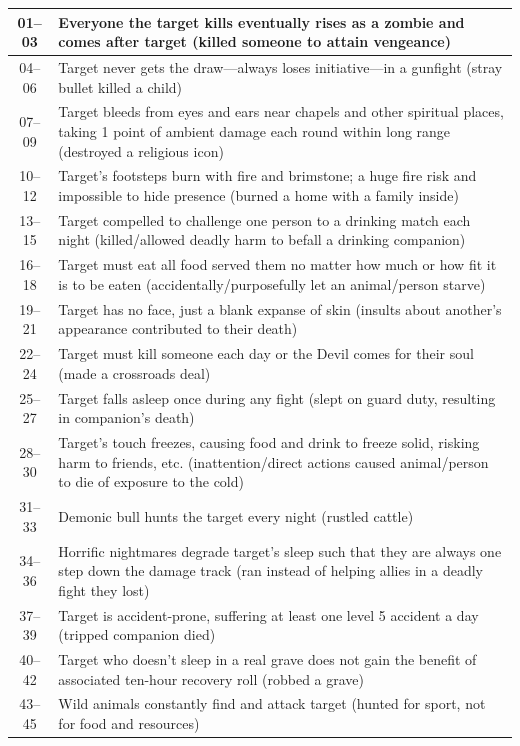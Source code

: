 \begin{longtable}{| c | p{15cm} |}
01–03 & Everyone the target kills eventually rises as a zombie and comes after target (killed someone to attain vengeance)  \\ \hline
04–06 & Target never gets the draw—always loses initiative—in a gunfight (stray bullet killed a child)  \\ \hline
07–09 & Target bleeds from eyes and ears near chapels and other spiritual places, taking 1 point of ambient damage each round within long range (destroyed a religious icon)  \\ \hline
10–12 & Target’s footsteps burn with fire and brimstone; a huge fire risk and impossible to hide presence (burned a home with a family inside)  \\ \hline
13–15  & Target compelled to challenge one person to a drinking match each night (killed/allowed deadly harm to befall a drinking companion)  \\ \hline
16–18  & Target must eat all food served them no matter how much or how fit it is to be eaten (accidentally/purposefully let an animal/person starve)  \\ \hline
19–21  & Target has no face, just a blank expanse of skin (insults about another’s appearance contributed to their death)  \\ \hline
22–24  & Target must kill someone each day or the Devil comes for their soul (made a crossroads deal)  \\ \hline
25–27  & Target falls asleep once during any fight (slept on guard duty, resulting in companion’s death)  \\ \hline
28–30  & Target’s touch freezes, causing food and drink to freeze solid, risking harm to friends, etc. (inattention/direct actions caused animal/person to die of exposure to the cold)  \\ \hline
31–33  & Demonic bull hunts the target every night (rustled cattle)  \\ \hline
34–36  & Horrific nightmares degrade target’s sleep such that they are always one step down the damage track (ran instead of helping allies in a deadly fight they lost)  \\ \hline
37–39  & Target is accident‑prone, suffering at least one level 5 accident a day (tripped companion died)  \\ \hline
40–42  & Target who doesn’t sleep in a real grave does not gain the benefit of associated ten-hour recovery roll (robbed a grave)  \\ \hline
43–45  & Wild animals constantly find and attack target (hunted for sport, not for food and resources)  \\ \hline

\end{longtable}
